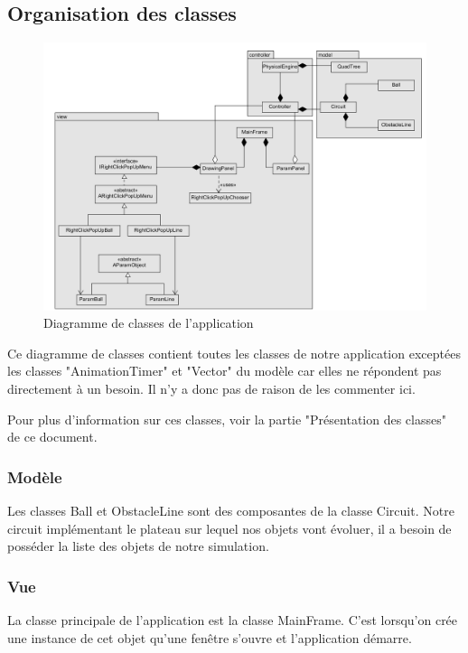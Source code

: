 \documentclass{report}
\begin{document}
\subsection{Organisation des classes}

\begin{figure}[H]
\centering
\includegraphics[scale=0.65]{uml.png}
\caption{Diagramme de classes de l'application}
\end{figure}

Ce diagramme de classes contient toutes les classes de notre application exceptées les classes "AnimationTimer" et "Vector" du modèle car elles ne répondent pas directement à un besoin. Il n'y a donc pas de raison de les commenter ici.

Pour plus d'information sur ces classes, voir la partie "Présentation des classes" de ce document.

\subsubsection{Modèle}

Les classes Ball et ObstacleLine sont des composantes de la classe Circuit. Notre circuit implémentant le plateau sur lequel nos objets vont évoluer, il a besoin de posséder la liste des objets de notre simulation.

\subsubsection{Vue}

La classe principale de l'application est la classe MainFrame. C'est lorsqu'on crée une instance de cet objet qu'une fenêtre s'ouvre et l'application démarre. \\
\end{document}
